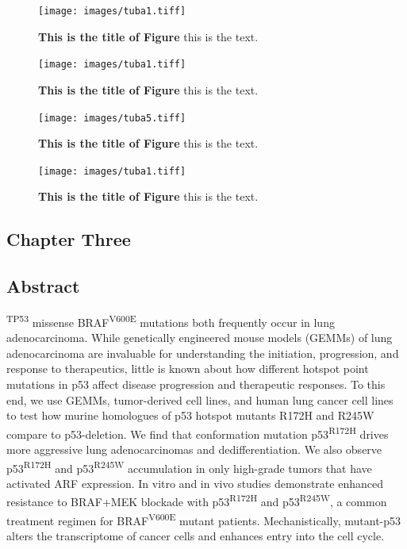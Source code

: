 \begin{figure}
\hypertarget{fig:06}{%
\centering
\texttt{[image: images/tuba1.tiff]}
\caption{\textbf{This is the title of Figure} this is the text.}\label{fig:06}
}
\end{figure}

\begin{figure}
\hypertarget{fig:06}{%
\centering
\texttt{[image: images/tuba1.tiff]}
\caption{\textbf{This is the title of Figure} this is the text.}\label{fig:06}
}
\end{figure}

\begin{figure}
\hypertarget{fig:06}{%
\centering
\texttt{[image: images/tuba5.tiff]}
\caption{\textbf{This is the title of Figure} this is the text.}\label{fig:06}
}
\end{figure}

\begin{figure}
\hypertarget{fig:06}{%
\centering
\texttt{[image: images/tuba1.tiff]}
\caption{\textbf{This is the title of Figure} this is the text.}\label{fig:06}
}
\end{figure}

\hypertarget{chapter-three}{%
\subsection{Chapter Three}\label{chapter-three}}

\hypertarget{abstract}{%
\subsection{Abstract}\label{abstract}}

\textsuperscript{TP53} missense BRAF\textsuperscript{V600E} mutations both frequently occur in lung adenocarcinoma. While genetically engineered mouse models (GEMMs) of lung adenocarcinoma are invaluable for understanding the initiation, progression, and response to therapeutics, little is known about how different hotspot point mutations in p53 affect disease progression and therapeutic responses. To this end, we use GEMMs, tumor-derived cell lines, and human lung cancer cell lines to test how murine homologues of p53 hotspot mutants R172H and R245W compare to p53-deletion. We find that conformation mutation p53\textsuperscript{R172H} drives more aggressive lung adenocarcinomas and dedifferentiation. We also observe p53\textsuperscript{R172H} and p53\textsuperscript{R245W} accumulation in only high-grade tumors that have activated ARF expression. In vitro and in vivo studies demonstrate enhanced resistance to BRAF+MEK blockade with p53\textsuperscript{R172H} and p53\textsuperscript{R245W}, a common treatment regimen for BRAF\textsuperscript{V600E} mutant patients. Mechanistically, mutant-p53 alters the transcriptome of cancer cells and enhances entry into the cell cycle.

